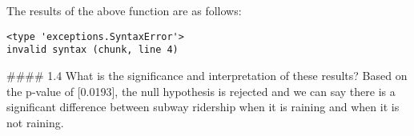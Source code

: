 The results of the above function are as follows:


\begin{verbatim}
<type 'exceptions.SyntaxError'>
invalid syntax (chunk, line 4)
\end{verbatim}


#### 1.4 What is the significance and interpretation of these results? Based on the p-value of [0.0193], the null hypothesis is rejected and we  can say there is a significant difference between subway ridership when  it is raining and when it is not raining.
